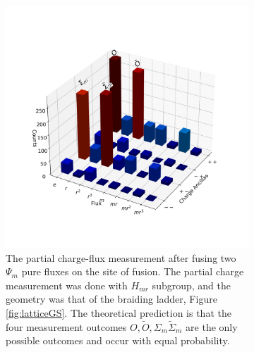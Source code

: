\documentclass[two column]{article}
\begin{document}
\begin{figure}
\vspace*{-5\baselineskip} %
\centering
\begin{subfigure}{0.47\textwidth}
    \includegraphics[width = \linewidth]{Figures/fusion_on_glasses.png}
    \caption{The partial charge-flux measurement after fusing two $\Psi_m$ pure fluxes on the site of fusion. The partial charge measurement was done with $H_{mr}$ subgroup, and the geometry was that of the braiding ladder, Figure \ref{fig:latticeGS}. The theoretical prediction is that the four measurement outcomes $O,\tilde O,\Sigma_m \tilde{\Sigma}_m$ are the only possible outcomes and occur with equal probability.}
    \label{fig:fusion_glass}
\end{subfigure}\hfill
\begin{subfigure}{0.47\textwidth}

\end{subfigure}
\end{figure}
\end{document}
